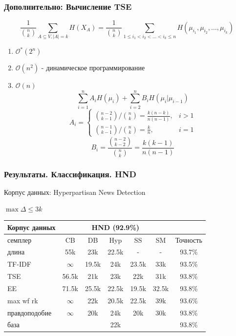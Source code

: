 \documentclass{beamer}
\begin{document}
\begin{frame}[label=supplemental,noframenumbering]
	\frametitle{Дополнительно: Вычисление TSE}
	\[
	\frac{1}{\binom{n}{k}}\sum\limits_{A\subseteq V,|A|=k}H(X_A) =
	\frac{1}{\binom{n}{k}}\sum\limits_{1 \le i_1 < i_2 < \ldots < i_k \le n}H(\mu_{i_1}, \mu_{i_2}, \ldots, \mu_{i_k})
	\]
	\begin{enumerate}
		\item $\mathcal{O^*}(2^n)$
		\item $\mathcal{O}(n^2)$ - динамическое программирование
		\item $\mathcal{O}(n)$
		\[
		\sum\limits_{i=1}^{n}A_iH(\mu_i) + \sum\limits_{i=2}^{n}B_iH(\mu_i|\mu_{i-1})
		\]
		\[
		A_i = 
		\begin{cases}
		\binom{n-2}{k-1}/\binom{n}{k}=\frac{k(n-k)}{n(n-1)},& i > 1 \\
		\binom{n-1}{k-1}/\binom{n}{k}=\frac k n,& i = 1
		\end{cases}
		\]
		\[
		B_i = \frac{\binom{n-2}{k-2}}{\binom{n}{k}} = \frac{k(k-1)}{n(n-1)}
		\]
	\end{enumerate}
\end{frame}

\begin{frame}[label=supplemental,noframenumbering]
	\frametitle{Результаты. Классификация. HND}
	
	Корпус данных: Hyperpartisan News Detection
	
	$\max\Delta \le 3k$
	\begin{table}
		\begin{tabular}{l|ccccc|c}
			Корпус данных & \multicolumn{5}{c}{HND (92.9\%)}\\
			\hline
			семплер & CB & DB & Hyp & SS & SM & Точность\\
			\hline
			длина & 55k & 23k & 22.5k & - & - & 93.7\% \\
			TF-IDF & $\infty$ & 19.5k & 24k & 23.5k & 33k & 93.5\% \\
			TSE & 56.5k & 21k & 23k & 22k & 31k & 93.8\% \\
			EE & 71.5k & 25.5k & 22.5k & 19.5k & 32.5k & 93.8\% \\
			max wf rk & $\infty$ & 22k & 20.5k & 22.5k & 39k & 93.6\% \\
			правдоподобие & $\infty$ & 20k & 24k & 20k & 30k & 93.8\% \\
			\hline
			база & \multicolumn{5}{c}{22k} & 93.8\%
		\end{tabular}
	\end{table}
\end{frame}
\end{document}

